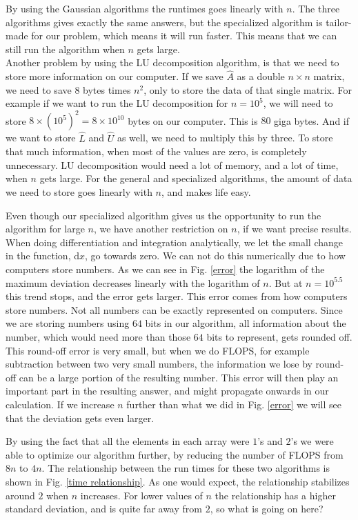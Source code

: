\documentclass[%
 reprint,
nofootinbib,
 amsmath,amssymb,
 aps,
]{revtex4-1}
\begin{document}
By using the Gaussian algorithms the runtimes goes linearly with $n$. The three algorithms gives exactly the same answers, but the specialized algorithm is tailor-made for our problem, which means it will run faster. This means that we can still run the algorithm when $n$ gets large. \\
Another problem by using the LU decomposition algorithm, is that we need to store more information on our computer. If we save $\hat{A}$ as a double $n\times n$ matrix, we need to save $8$ bytes times $n^2$, only to store the data of that single matrix. For example if we want to run the LU decomposition for $n=10^5$, we will need to store $8\times (10^5)^2 = 8 \times 10^{10}$ bytes on our computer. This is $80$ giga bytes. And if we want to store $\hat{L}$ and $\hat{U}$ as well, we need to multiply this by three. To store that much information, when most of the values are zero, is completely unnecessary. LU decomposition would need a lot of memory, and a lot of time, when $n$ gets large. For the general and specialized algorithms, the amount of data we need to store goes linearly with $n$, and makes life easy.
\par
Even though our specialized algorithm gives us the opportunity to run the algorithm for large $n$, we have another restriction on $n$, if we want precise results. When doing differentiation and integration analytically, we let the small change in the function, d$x$, go towards zero. We can not do this numerically due to how computers store numbers. As we can see in Fig. \vref{error} the logarithm of the maximum deviation decreases linearly with the logarithm of $n$. But at $n=10^{5.5}$ this trend stops, and the error gets larger. This error comes from how computers store numbers. Not all numbers can be exactly represented on computers. Since we are storing numbers using $64$ bits in our algorithm, all information about the number, which would need more than those $64$ bits to represent, gets rounded off. This round-off error is very small, but when we do FLOPS, for example subtraction between two very small numbers, the information we lose by round-off can be a large portion of the resulting number. This error will then play an important part in the resulting answer, and might propagate onwards in our calculation. If we increase $n$ further than what we did in Fig. \vref{error} we will see that the deviation gets even larger.
\par
By using the fact that all the elements in each array were $1$'s and $2$'s we were able to optimize our algorithm further, by reducing the number of FLOPS from $8n$ to $4n$. The relationship between the run times for these two algorithms is shown in Fig. \vref{time relationship}. As one would expect, the relationship stabilizes around $2$ when $n$ increases. For lower values of $n$ the relationship has a higher standard deviation, and is quite far away from $2$, so what is going on here?\\
\end{document}
